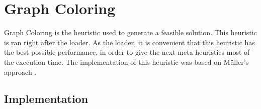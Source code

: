 \section{Graph Coloring}

Graph Coloring is the heuristic used to generate a feasible solution. This heuristic is ran right after the loader. As the loader, it is convenient that this heuristic has the best possible performance, in order to give the next meta-heuristics most of the execution time. The implementation of this heuristic was based on M\"{u}ller's approach \cite{Mueller2009}.\\

\subsection{Implementation}

